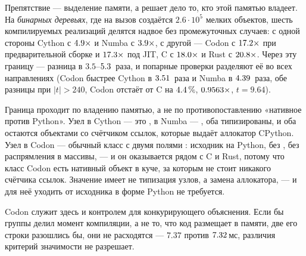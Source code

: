 Препятствие --- выделение памяти, а решает дело то, кто этой памятью владеет. На \emph{бинарных
деревьях}, где на вызов создаётся $2.6\cdot10^5$ мелких объектов, шесть компилируемых реализаций
делятся надвое без промежуточных случаев: с одной стороны Cython с $\meas{ratio:b2_branchy-314:binarytrees/cpython_loop|b2_branchy-314:binarytrees/cython}{4.9}\times$ и Numba с
$\meas{ratio:b2_branchy-314:binarytrees/cpython_loop|b2_branchy-314:binarytrees/numba}{3.9}\times$, с другой --- Codon с $\meas{ratio:b2_branchy-314:binarytrees/cpython_loop|b2_branchy-314:binarytrees/codon_pyext}{17.2}\times$ при предварительной сборке и $\meas{ratio:b2_branchy-314:binarytrees/cpython_loop|b2_branchy-314:binarytrees/codon_jit}{17.3}\times$ под
JIT, C с $\meas{ratio:b2_branchy-314:binarytrees/cpython_loop|b2_branchy-314:binarytrees/c_ctypes}{18.0}\times$ и Rust с $\meas{ratio:b2_branchy-314:binarytrees/cpython_loop|b2_branchy-314:binarytrees/rust_ctypes}{20.8}\times$. Через эту границу --- разница в $3.5$--$\meas{ratio:b2_branchy-314:binarytrees/numba|b2_branchy-314:binarytrees/rust_ctypes}{5.3}$~раза,
и попарные проверки разделяют её во всех направлениях (Codon быстрее Cython в $\meas{ratio:b2_branchy-314:binarytrees/cython|b2_branchy-314:binarytrees/codon_pyext}{3.51}$~раза и
Numba в $\meas{ratio:b2_branchy-314:binarytrees/numba|b2_branchy-314:binarytrees/codon_pyext}{4.39}$~раза, обе разницы при $|t| > 240$, Codon отстаёт от C на $\meas{saving:b2_branchy-314:binarytrees/c_ctypes|b2_branchy-314:binarytrees/codon_pyext}{4.4}\,\%$,
$\meas{ratio:b2_branchy-314:binarytrees/c_ctypes|b2_branchy-314:binarytrees/codon_pyext}{0.9563}\times$, $t=9.64$).

Граница проходит по владению памятью, а не по противопоставлению «нативное против Python». Узел в
Cython --- это , в Numba --- , оба типизированы, и оба остаются
объектами со счётчиком ссылок, которые выдаёт аллокатор CPython. Узел в Codon --- обычный класс с
двумя полями : исходник на Python, без , без распрямления в
массивы, --- и он оказывается рядом с C и Rust, потому что класс Codon есть нативный объект в
куче, за которым не стоит никакого счётчика ссылок. Значение имеет не типизация узлов, а замена
аллокатора, --- и для неё уходить от исходника в форме Python не требуется.

Codon служит здесь и контролем для конкурирующего объяснения. Если бы группы делил момент
компиляции, а не то, что код размещает в памяти, две его строки разошлись бы, они не расходятся
--- $7.37$ против $\meas{med:b2_branchy-314:binarytrees/codon_jit:ms}{7.32}$\,мс, различия критерий значимости не разрешает.


